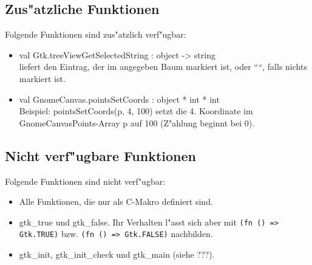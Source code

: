 \documentclass{article}
\begin{document}
\subsection{Zus"atzliche Funktionen}

Folgende Funktionen sind zus"atzlich verf"ugbar:

\begin{itemize}
\item val Gtk.treeViewGetSelectedString : object -> string\\
      liefert den Eintrag, der im angegeben Baum markiert ist, oder ````, falls
      nichts markiert ist.
\item val GnomeCanvas.pointsSetCoords : object * int * int\\
      Beispiel: pointsSetCoords(p, 4, 100) setzt die 4. Koordinate im
      GnomeCanvasPoints-Array p auf 100 (Z"ahlung beginnt bei 0).
\end{itemize}

\subsection{Nicht verf"ugbare Funktionen}

Folgende Funktionen sind nicht verf"ugbar:
\begin{itemize}
\item Alle Funktionen, die nur als C-Makro definiert sind.
\item gtk\_true und gtk\_false. Ihr Verhalten l"asst sich aber mit
      \texttt{(fn () => Gtk.TRUE)} bzw. \texttt{(fn () => Gtk.FALSE)}
      nachbilden.
\item gtk\_init, gtk\_init\_check und gtk\_main (siehe ???).
\end{itemize}
\end{document}
